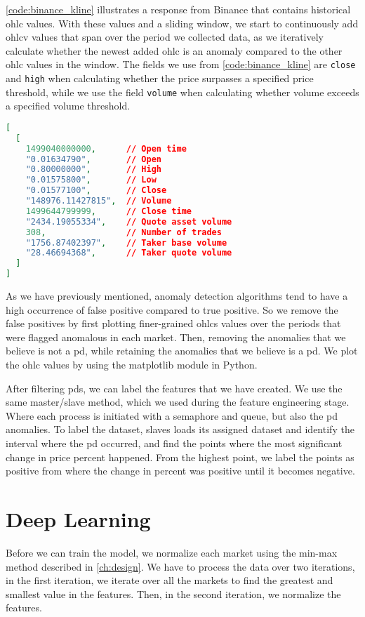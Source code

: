 \autoref{code:binance_kline} illustrates a response from Binance that contains historical \ac{ohlc} values. With these values and a sliding window, we start to continuously add \ac{ohlcv} values that span over the period we collected data, as we iteratively calculate whether the newest added \ac{ohlc} is an anomaly compared to the other \ac{ohlc} values in the window. The fields we use from \autoref{code:binance_kline} are \texttt{close} and \texttt{high} when calculating whether the price surpasses a specified price threshold, while we use the field \texttt{volume} when calculating whether volume exceeds a specified volume threshold.

\begin{lstlisting}[language=json, caption={Historical kline response from Binance (Source \cite{binance_git})}, label=code:binance_kline, firstnumber=1]
[
  [
    1499040000000,      // Open time
    "0.01634790",       // Open
    "0.80000000",       // High
    "0.01575800",       // Low
    "0.01577100",       // Close
    "148976.11427815",  // Volume
    1499644799999,      // Close time
    "2434.19055334",    // Quote asset volume
    308,                // Number of trades
    "1756.87402397",    // Taker base volume
    "28.46694368",      // Taker quote volume
  ]
]
\end{lstlisting}

As we have previously mentioned,  anomaly detection algorithms tend to have a high occurrence of false positive compared to true positive. So we remove the false positives by first plotting finer-grained \acp{ohlc} values over the periods that were flagged anomalous in each market. Then, removing the anomalies that we believe is not a \ac{pd}, while retaining the anomalies that we believe is a \ac{pd}. We plot the \ac{ohlc} values by using the matplotlib module in Python.

After filtering \acp{pd}, we can label the features that we have created. We use the same master/slave method, which we used during the feature engineering stage. Where each process is initiated with a semaphore and queue, but also the \ac{pd} anomalies. To label the dataset, slaves loads its assigned dataset and identify the interval where the \ac{pd} occurred, and find the points where the most significant change in price percent happened. From the highest point, we label the points as positive from where the change in percent was positive until it becomes negative.

\section{Deep Learning}
Before we can train the model, we normalize each market using the min-max method described in \autoref{ch:design}. We have to process the data over two iterations, in the first iteration, we iterate over all the markets to find the greatest and smallest value in the features. Then, in the second iteration, we normalize the features.

